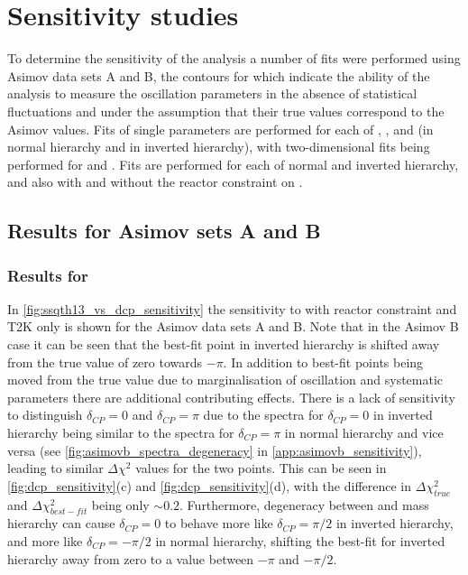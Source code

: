 \clearpage

\section {Sensitivity studies}
\label{sec:sensitivity}
To determine the sensitivity of the analysis a number of fits were performed using Asimov data sets A and B, the contours for which indicate the ability of the analysis to measure the oscillation parameters in the absence of statistical fluctuations and under the assumption that their true values correspond to the Asimov values. Fits of single parameters are performed for each of \ssqthonethree, \deltacp, \ssqthtwothree and \dmsq (\dmsqtwothree in normal hierarchy and \dmsqonethree in inverted hierarchy), with two-dimensional fits being performed for \appearance and \disappearance. Fits are performed for each of normal and inverted hierarchy, and also with and without the reactor constraint on \ssqthonethree.

\subsection{Results for Asimov sets A and B}
\label{sec:sensitivity:asimov_results}

\subsubsection{Results for \appearance}
In \cref{fig:ssqth13_vs_dcp_sensitivity} the sensitivity to \appearance with reactor constraint and T2K only is shown for the Asimov data sets A and B. Note that in the Asimov B case it can be seen that the best-fit point in inverted hierarchy is shifted away from the true \deltacp value of zero towards $-\pi$. In addition to best-fit points being moved from the true value due to marginalisation of oscillation and systematic parameters there are additional contributing effects. There is a lack of sensitivity to distinguish $\delta_{CP} = 0$ and $\delta_{CP} = \pi$ due to the spectra for $\delta_{CP} = 0$ in inverted hierarchy being similar to the spectra for $\delta_{CP} = \pi$ in normal hierarchy and vice versa (see \cref{fig:asimovb_spectra_degeneracy} in \cref{app:asimovb_sensitivity}), leading to similar $\Delta\chi^2$ values for the two points. This can be seen in \cref{fig:dcp_sensitivity}(c) and \cref{fig:dcp_sensitivity}(d), with the difference in $\Delta\chi^2_{true}$ and $\Delta\chi^2_{best-fit}$ being only $\sim 0.2$. Furthermore, degeneracy between \deltacp and mass hierarchy can cause $\delta_{CP} = 0$ to behave more like $\delta_{CP} = \pi/2$ in inverted hierarchy, and more like $\delta_{CP} = -\pi/2$ in normal hierarchy, shifting the best-fit for inverted hierarchy away from zero to a value between $-\pi$ and $-\pi/2$.

